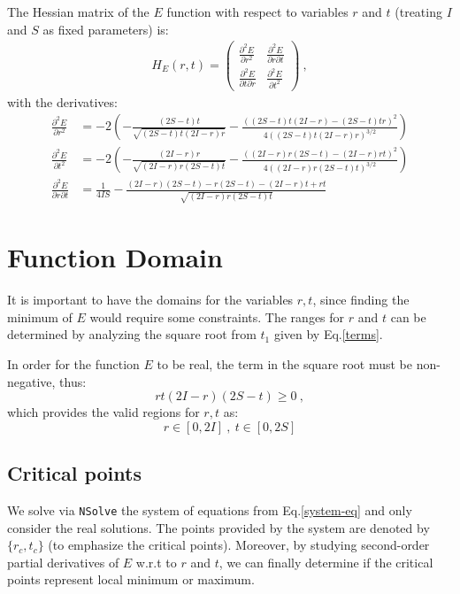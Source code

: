 \documentclass[a4paper]{article}
\begin{document}
The Hessian matrix of the $E$ function with respect to variables $r$ and $t$ (treating $I$ and $S$ as fixed parameters) is:
\begin{align}
H_{E}(r,t) = 
\begin{pmatrix}
\frac{\partial^2 E}{\partial r^2} & \frac{\partial^2 E}{\partial r \partial t} \\
\frac{\partial^2 E}{\partial t \partial r} & \frac{\partial^2 E}{\partial t^2}
\end{pmatrix}\ ,
\end{align}
with the derivatives:
\begin{align}
    \frac{\partial^2 E}{\partial r^2} &= -2 \left( - \frac{(2S - t) t}{\sqrt{(2S - t) t (2I - r) r}} - \frac{((2S - t) t (2I - r) - (2S - t) t r)^2}{4 \left( (2S - t) t (2I - r) r \right)^{3/2}} \right) \\
    \frac{\partial^2 E}{\partial t^2} &= -2 \left( - \frac{(2I - r) r}{\sqrt{(2I - r) r (2S - t) t}} - \frac{((2I - r) r (2S - t) - (2I - r) r t)^2}{4 \left( (2I - r) r (2S - t) t \right)^{3/2}} \right) \\
    \frac{\partial^2 E}{\partial r \partial t} &= \frac{1}{4IS} - \frac{(2I - r)(2S - t) - r(2S - t) - (2I - r) t + rt}{\sqrt{(2I - r) r (2S - t) t}}
\end{align}

\section{Function Domain}

It is important to have the domains for the variables $r, t$, since finding the minimum of $E$ would require some constraints. The ranges for $r$ and $t$ can be determined by analyzing the square root from $t_1$ given by Eq.\eqref{terms}.

In order for the function $E$ to be real, the term in the square root must be non-negative, thus:
$$rt(2I-r)(2S-t)\geq 0\ ,$$
which provides the valid regions for $r, t$ as:
$$r\in [0, 2I]\ , \ t\in [0, 2S]$$

\subsection{Critical points}

We solve via \texttt{NSolve} the system of equations from Eq.\eqref{system-eq} and only consider the real solutions. The points provided by the system are denoted by $\{r_c, t_c\}$ (to emphasize the critical points). Moreover, by studying second-order partial derivatives of $E$ w.r.t to $r$ and $t$, we can finally determine if the critical points represent local minimum or maximum.
\end{document}
